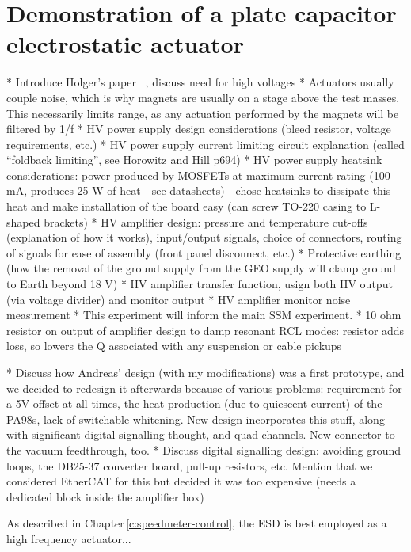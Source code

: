 \chapter{Demonstration of a plate capacitor electrostatic actuator}
\label{c:esd-concept}

* Introduce Holger's paper~\cite{Wittel2015} \etal{}, discuss need for high voltages
* Actuators usually couple noise, which is why magnets are usually on a stage above the test masses. This necessarily limits range, as any actuation performed by the magnets will be filtered by 1/f
* HV power supply design considerations (bleed resistor, voltage requirements, etc.)
* HV power supply current limiting circuit explanation (called ``foldback limiting'', see Horowitz and Hill p694)
* HV power supply heatsink considerations: power produced by MOSFETs at maximum current rating (100 mA, produces 25 W of heat - see datasheets) - chose heatsinks to dissipate this heat and make installation of the board easy (can screw TO-220 casing to L-shaped brackets)
* HV amplifier design: pressure and temperature cut-offs (explanation of how it works), input/output signals, choice of connectors, routing of signals for ease of assembly (front panel disconnect, etc.)
* Protective earthing (how the removal of the ground supply from the GEO supply will clamp ground to Earth beyond 18 V)
* HV amplifier transfer function, usign both HV output (via voltage divider) and monitor output
* HV amplifier monitor noise measurement
* This experiment will inform the main SSM experiment.
* 10 ohm resistor on output of amplifier design to damp resonant RCL modes: resistor adds loss, so lowers the Q associated with any suspension or cable pickups

* Discuss how Andreas' design (with my modifications) was a first prototype, and we decided to redesign it afterwards because of various problems: requirement for a 5V offset at all times, the heat production (due to quiescent current) of the PA98s, lack of switchable whitening. New design incorporates this stuff, along with significant digital signalling thought, and quad channels. New connector to the vacuum feedthrough, too.
* Discuss digital signalling design: avoiding ground loops, the DB25-37 converter board, pull-up resistors, etc. Mention that we considered EtherCAT for this but decided it was too expensive (needs a dedicated block inside the amplifier box)

As described in Chapter\,\ref{c:speedmeter-control}, the \gls{ESD} is best employed as a high frequency actuator...

